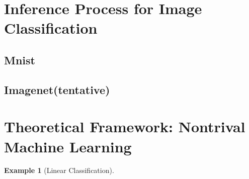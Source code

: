 \documentclass[11pt, oneside]{article}   	%
\theoremstyle{definition}
\newtheorem*{eg}{Example}
\begin{document}
\section{Inference Process for Image Classification}
\subsection{Mnist}
\subsection{Imagenet(tentative)}

\section{Theoretical Framework: Nontrival Machine Learning}

\begin{eg}
	[Linear Classification]
\end{eg}
\end{document}

